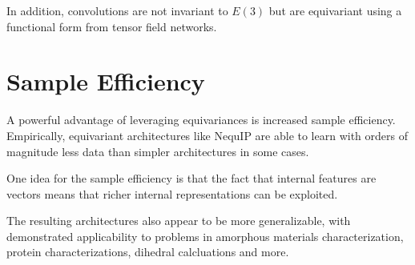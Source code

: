 \documentclass[book.tex]{subfiles}
\begin{document}
In addition, convolutions are not invariant to $E(3)$ but are equivariant using a functional form from tensor field networks.









\section{Sample Efficiency}

A powerful advantage of leveraging equivariances is increased sample efficiency. Empirically, equivariant architectures like NequIP are able to learn with orders of magnitude less data than simpler architectures in some cases.

One idea for the sample efficiency is that the fact that internal features are vectors means that richer internal representations can be exploited.

The resulting architectures also appear to be more generalizable, with demonstrated applicability to problems in amorphous materials characterization, protein characterizations, dihedral calcluations and more. %
\end{document}
